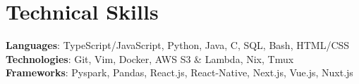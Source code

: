 \section{Technical Skills}
\begin{itemize}[leftmargin=0.15in, label={}]
	\small{\item{
	      \textbf{Languages}{: TypeScript/JavaScript, Python, Java, C, SQL, Bash, HTML/CSS } \\
        \textbf{Technologies}{: Git, Vim, Docker, AWS S3 \& Lambda, Nix, Tmux } \\
        \textbf{Frameworks}{: Pyspark, Pandas, React.js, React-Native, Next.js, Vue.js, Nuxt.js}}}
\end{itemize}
